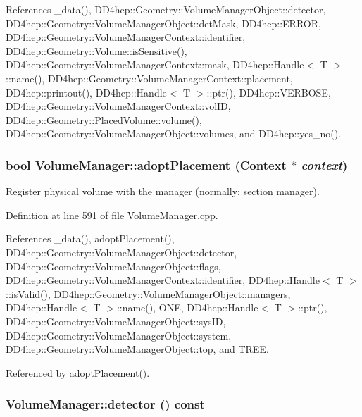 References \_\-data(), DD4hep::Geometry::VolumeManagerObject::detector, DD4hep::Geometry::VolumeManagerObject::detMask, DD4hep::ERROR, DD4hep::Geometry::VolumeManagerContext::identifier, DD4hep::Geometry::Volume::isSensitive(), DD4hep::Geometry::VolumeManagerContext::mask, DD4hep::Handle$<$ T $>$::name(), DD4hep::Geometry::VolumeManagerContext::placement, DD4hep::printout(), DD4hep::Handle$<$ T $>$::ptr(), DD4hep::VERBOSE, DD4hep::Geometry::VolumeManagerContext::volID, DD4hep::Geometry::PlacedVolume::volume(), DD4hep::Geometry::VolumeManagerObject::volumes, and DD4hep::yes\_\-no().\hypertarget{class_d_d4hep_1_1_geometry_1_1_volume_manager_acfeddaf04beb69692702c453a9ad9933}{
\subsubsection[{adoptPlacement}]{\setlength{\rightskip}{0pt plus 5cm}bool VolumeManager::adoptPlacement ({\bf Context} $\ast$ {\em context})}}
\label{class_d_d4hep_1_1_geometry_1_1_volume_manager_acfeddaf04beb69692702c453a9ad9933}


Register physical volume with the manager (normally: section manager). 

Definition at line 591 of file VolumeManager.cpp.

References \_\-data(), adoptPlacement(), DD4hep::Geometry::VolumeManagerObject::detector, DD4hep::Geometry::VolumeManagerObject::flags, DD4hep::Geometry::VolumeManagerContext::identifier, DD4hep::Handle$<$ T $>$::isValid(), DD4hep::Geometry::VolumeManagerObject::managers, DD4hep::Handle$<$ T $>$::name(), ONE, DD4hep::Handle$<$ T $>$::ptr(), DD4hep::Geometry::VolumeManagerObject::sysID, DD4hep::Geometry::VolumeManagerObject::system, DD4hep::Geometry::VolumeManagerObject::top, and TREE.

Referenced by adoptPlacement().\hypertarget{class_d_d4hep_1_1_geometry_1_1_volume_manager_a6cd7f039c11a3bafe055375ce449a83d}{
\subsubsection[{detector}]{ VolumeManager::detector () const}}
\label{class_d_d4hep_1_1_geometry_1_1_volume_manager_a6cd7f039c11a3bafe055375ce449a83d}


